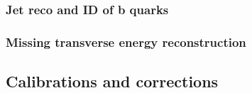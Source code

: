 \subsubsection{Jet reco and ID of b quarks}


\subsubsection{Missing transverse energy reconstruction}
\subsection{Calibrations and corrections}
